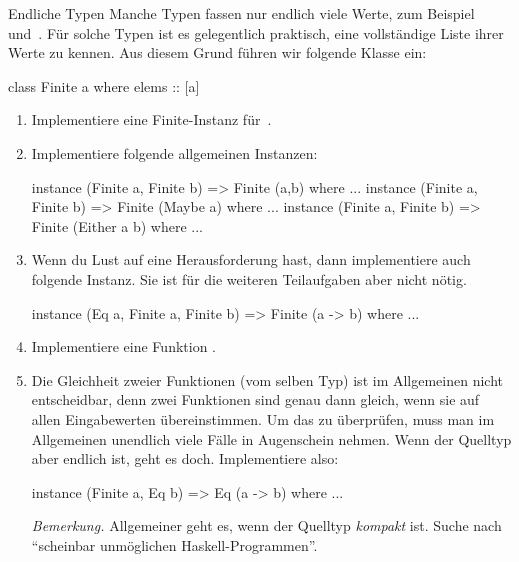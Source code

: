 \documentclass{uebblatt}
\begin{document}
\begin{aufgabe}{Endliche Typen}
Manche Typen fassen nur endlich viele Werte, zum Beispiel~
und~. Für solche Typen ist es gelegentlich
praktisch, eine vollständige Liste ihrer Werte zu kennen. Aus diesem Grund
führen wir folgende Klasse ein:
\begin{haskellcode}
class Finite a where
    elems :: [a]
\end{haskellcode}
\begin{enumerate}
\item Implementiere eine Finite-Instanz für~.
\item Implementiere folgende allgemeinen Instanzen:
\begin{haskellcode}
instance (Finite a, Finite b) => Finite (a,b)        where ...
instance (Finite a, Finite b) => Finite (Maybe a)    where ...
instance (Finite a, Finite b) => Finite (Either a b) where ...
\end{haskellcode}
\item Wenn du Lust auf eine Herausforderung hast, dann implementiere auch
folgende Instanz. Sie ist für die weiteren Teilaufgaben aber nicht nötig.
\begin{haskellcode}
instance (Eq a, Finite a, Finite b) => Finite (a -> b) where ...
\end{haskellcode}
\item Implementiere eine Funktion .
\item Die Gleichheit zweier Funktionen (vom selben Typ) ist im Allgemeinen
nicht entscheidbar, denn zwei Funktionen sind genau dann gleich, wenn sie auf
allen Eingabewerten übereinstimmen. Um das zu überprüfen, muss man im
Allgemeinen unendlich viele Fälle in Augenschein nehmen. Wenn der Quelltyp aber
endlich ist, geht es doch. Implementiere also:
\begin{haskellcode}
instance (Finite a, Eq b) => Eq (a -> b) where ...
\end{haskellcode}
{\scriptsize\emph{Bemerkung.} Allgemeiner geht es, wenn der Quelltyp
\emph{kompakt} ist. Suche nach "`scheinbar unmöglichen
Haskell-Programmen"'.\par}
\end{enumerate}
\end{aufgabe}
\end{document}
